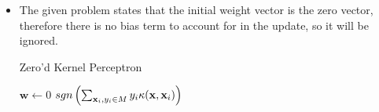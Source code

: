\begin{enumerate}
\begin{itemize}
\item The given problem states that the initial weight vector is the zero vector, therefore there is no bias term to account for in the update, so it will be ignored.

\begin{algorithm}
\caption{Zero'd Kernel Perceptron}
\begin{algorithmic}
\STATE $\mathbf{w}\leftarrow 0$
    \ENDIF
\ENDFOR
\RETURN $sgn\left( \sum_{{\bf x}_{i},y_{i}\in M} y_{i}\kappa(\mathbf{x},\mathbf{x}_{i})\right)$
\end{algorithmic}
\end{algorithm}
\end{itemize} 
\end{enumerate}


